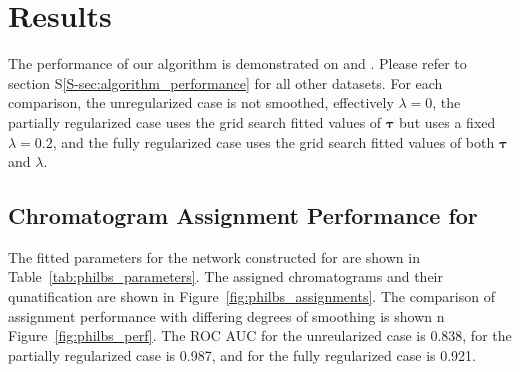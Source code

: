 \section{Results}
The performance of our algorithm is demonstrated on \philbs and \rphumanserum.
Please refer to section S\ref{S-sec:algorithm_performance} for all other datasets.
For each comparison, the unregularized case is not smoothed, effectively $\lambda = 0$,
the partially regularized case uses the grid search fitted values of $\mathbf{\tau}$ but
uses a fixed $\lambda = 0.2$, and the fully regularized case uses the grid search fitted
values of both $\mathbf{\tau}$ and $\lambda$.

\subsection{Chromatogram Assignment Performance for \philbs}
    The fitted parameters for the network constructed for \philbs are shown in
    Table~\ref{tab:philbs_parameters}. The assigned chromatograms and their qunatification
    are shown in Figure~\ref{fig:philbs_assignments}. The comparison of assignment performance
    with differing degrees of smoothing is shown n Figure~\ref{fig:philbs_perf}. The ROC AUC
    for the unreularized case is 0.838, for the partially regularized case is 0.987, and for
    the fully regularized case is 0.921.

